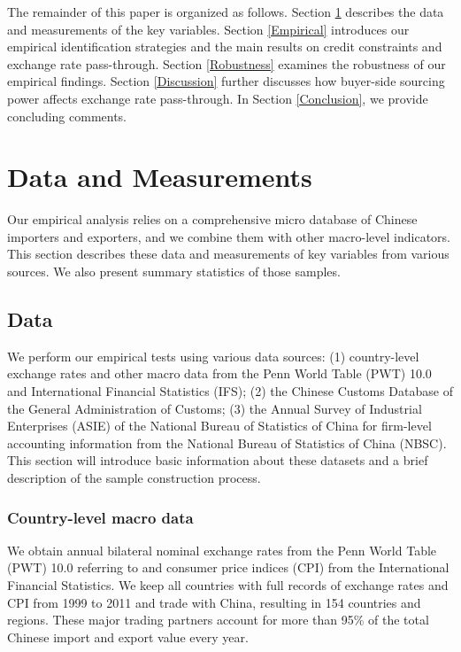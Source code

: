 The remainder of this paper is organized as follows. Section \ref{Data&Measurements} describes the data and measurements of the key variables. Section \ref{Empirical} introduces our empirical identification strategies and the main results on credit constraints and exchange rate pass-through. Section \ref{Robustness} examines the robustness of our empirical findings. Section \ref{Discussion} further discusses how buyer-side sourcing power affects exchange rate pass-through. In Section \ref{Conclusion}, we provide concluding comments.

\section{Data and Measurements} \label{Data&Measurements}

Our empirical analysis relies on a comprehensive micro database of Chinese importers and exporters, and we combine them with other macro-level indicators. This section describes these data and measurements of key variables from various sources. We also present summary statistics of those samples.

\subsection{Data} \label{Data}

We perform our empirical tests using various data sources: (1) country-level exchange rates and other macro data from the Penn World Table (PWT) 10.0 and International Financial Statistics (IFS); (2) the Chinese Customs Database of the General Administration of Customs; (3) the Annual Survey of Industrial Enterprises (ASIE) of the National Bureau of Statistics of China for firm-level accounting information from the National Bureau of Statistics of China (NBSC). This section will introduce basic information about these datasets and a brief description of the sample construction process.

\subsubsection{Country-level macro data} \label{Data-Macro}

We obtain annual bilateral nominal exchange rates from the Penn World Table (PWT) 10.0 referring to \cite{feenstra2015} and consumer price indices (CPI) from the International Financial Statistics. We keep all countries with full records of exchange rates and CPI from 1999 to 2011 and trade with China, resulting in 154 countries and regions. These major trading partners account for more than 95\% of the total Chinese import and export value every year.

